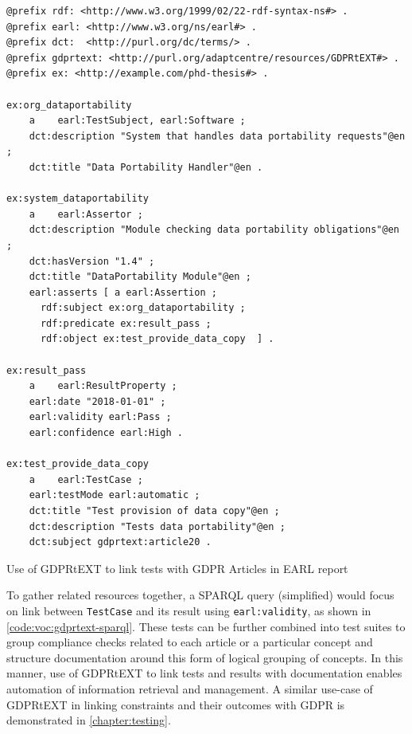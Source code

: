 \begin{listing}
\begin{verbatim}
@prefix rdf: <http://www.w3.org/1999/02/22-rdf-syntax-ns#> .
@prefix earl: <http://www.w3.org/ns/earl#> .
@prefix dct:  <http://purl.org/dc/terms/> .
@prefix gdprtext: <http://purl.org/adaptcentre/resources/GDPRtEXT#> .
@prefix ex: <http://example.com/phd-thesis#> .

ex:org_dataportability
    a    earl:TestSubject, earl:Software ;
    dct:description "System that handles data portability requests"@en ;
    dct:title "Data Portability Handler"@en .

ex:system_dataportability
    a    earl:Assertor ;
    dct:description "Module checking data portability obligations"@en ;
    dct:hasVersion "1.4" ;
    dct:title "DataPortability Module"@en ;
    earl:asserts [ a earl:Assertion ; 
      rdf:subject ex:org_dataportability ;
      rdf:predicate ex:result_pass ;
      rdf:object ex:test_provide_data_copy  ] .

ex:result_pass
    a    earl:ResultProperty ;
    earl:date "2018-01-01" ;
    earl:validity earl:Pass ;
    earl:confidence earl:High .

ex:test_provide_data_copy
    a    earl:TestCase ;
    earl:testMode earl:automatic ;
    dct:title "Test provision of data copy"@en ;
    dct:description "Tests data portability"@en ;
    dct:subject gdprtext:article20 .
\end{verbatim}
\caption{Use of GDPRtEXT to link tests with GDPR Articles in EARL report}
\label{earl}
\end{listing}

To gather related resources together, a SPARQL query (simplified) would focus on link between \texttt{TestCase} and its result using \texttt{earl:validity}, as shown in \autoref{code:voc:gdprtext-sparql}.
These tests can be further combined into test suites to group compliance checks related to each article or a particular concept and structure  documentation around this form of logical grouping of concepts.
In this manner, use of GDPRtEXT to link tests and results with documentation enables automation of information retrieval and management.
A similar use-case of GDPRtEXT in linking constraints and their outcomes with GDPR is demonstrated in \autoref{chapter:testing}.

